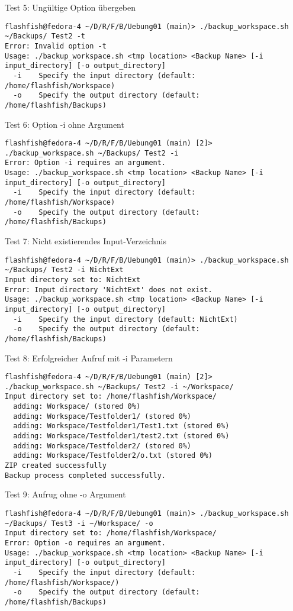 \documentclass{report}
\begin{document}
Test 5: Ungültige Option übergeben
\begin{lstlisting}[style=cppstyle, title=\texttt{Terminal Output}]
flashfish@fedora-4 ~/D/R/F/B/Uebung01 (main)> ./backup_workspace.sh ~/Backups/ Test2 -t
Error: Invalid option -t
Usage: ./backup_workspace.sh <tmp location> <Backup Name> [-i input_directory] [-o output_directory]
  -i    Specify the input directory (default: /home/flashfish/Workspace)
  -o    Specify the output directory (default: /home/flashfish/Backups)
\end{lstlisting}
Test 6: Option -i ohne Argument
\begin{lstlisting}[style=cppstyle, title=\texttt{Terminal Output}]
flashfish@fedora-4 ~/D/R/F/B/Uebung01 (main) [2]> ./backup_workspace.sh ~/Backups/ Test2 -i
Error: Option -i requires an argument.
Usage: ./backup_workspace.sh <tmp location> <Backup Name> [-i input_directory] [-o output_directory]
  -i    Specify the input directory (default: /home/flashfish/Workspace)
  -o    Specify the output directory (default: /home/flashfish/Backups)
\end{lstlisting}
Test 7: Nicht existierendes Input-Verzeichnis
\begin{lstlisting}[style=cppstyle, title=\texttt{Terminal Output}]
flashfish@fedora-4 ~/D/R/F/B/Uebung01 (main)> ./backup_workspace.sh ~/Backups/ Test2 -i NichtExt
Input directory set to: NichtExt
Error: Input directory 'NichtExt' does not exist.
Usage: ./backup_workspace.sh <tmp location> <Backup Name> [-i input_directory] [-o output_directory]
  -i    Specify the input directory (default: NichtExt)
  -o    Specify the output directory (default: /home/flashfish/Backups)
\end{lstlisting}
Test 8: Erfolgreicher Aufruf mit -i Parametern
\begin{lstlisting}[style=cppstyle, title=\texttt{Terminal Output}]
flashfish@fedora-4 ~/D/R/F/B/Uebung01 (main) [2]> ./backup_workspace.sh ~/Backups/ Test2 -i ~/Workspace/ 
Input directory set to: /home/flashfish/Workspace/
  adding: Workspace/ (stored 0%)
  adding: Workspace/Testfolder1/ (stored 0%)
  adding: Workspace/Testfolder1/Test1.txt (stored 0%)
  adding: Workspace/Testfolder1/test2.txt (stored 0%)
  adding: Workspace/Testfolder2/ (stored 0%)
  adding: Workspace/Testfolder2/o.txt (stored 0%)
ZIP created successfully
Backup process completed successfully.
\end{lstlisting}
Test 9: Aufrug ohne -o Argument
\begin{lstlisting}[style=cppstyle, title=\texttt{Terminal Output}]
flashfish@fedora-4 ~/D/R/F/B/Uebung01 (main)> ./backup_workspace.sh ~/Backups/ Test3 -i ~/Workspace/ -o 
Input directory set to: /home/flashfish/Workspace/
Error: Option -o requires an argument.
Usage: ./backup_workspace.sh <tmp location> <Backup Name> [-i input_directory] [-o output_directory]
  -i    Specify the input directory (default: /home/flashfish/Workspace/)
  -o    Specify the output directory (default: /home/flashfish/Backups)
\end{lstlisting}
\end{document}
